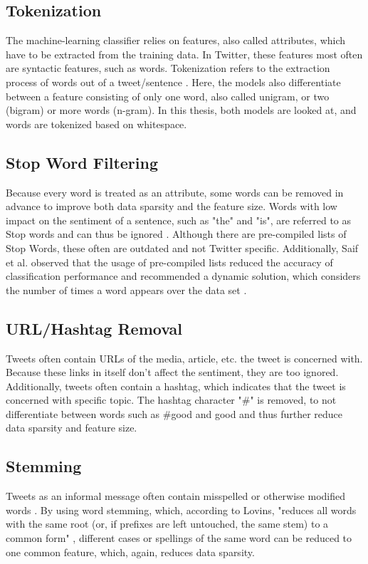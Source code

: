 \subsection{Tokenization}
The machine-learning classifier relies on features, also called attributes, which have to be extracted from the training data. In Twitter, these features most often are syntactic features, such as words. Tokenization refers to the extraction process of words out of a tweet/sentence \cite{DBLP:journals/csur/GiachanouC16}.  Here, the models also differentiate between a feature consisting of only one word, also called unigram, or two (bigram) or more words (n-gram). In this thesis, both models are looked at, and words are tokenized based on whitespace.
\subsection{Stop Word Filtering}
Because every word is treated as an attribute, some words can be removed in advance to improve both data sparsity and the feature size. Words with low impact on the sentiment of a sentence, such as "the" and "is", are referred to as Stop words and can thus be ignored \cite{DBLP:journals/csur/GiachanouC16}. Although there are pre-compiled lists of Stop Words, these often are outdated and not Twitter specific. Additionally, Saif et al. observed that the usage of pre-compiled lists reduced the accuracy of classification performance and recommended a dynamic solution, which considers the number of times a word appears over the data set \cite{data_sparsity}. 

\subsection{URL/Hashtag Removal}
Tweets often contain URLs of the media, article, etc. the tweet is concerned with. Because these links in itself don't affect the sentiment, they are too ignored. Additionally, tweets often contain a hashtag, which indicates that the tweet is concerned with specific topic. The hashtag character "\#" is removed, to not differentiate between words such as \#good and good and thus further reduce data sparsity and feature size.
\subsection{Stemming}
Tweets as an informal message often contain misspelled or otherwise modified words \cite{DBLP:journals/csur/GiachanouC16}. By using word stemming, which, according to Lovins, "reduces all words with the same root (or, if prefixes are left
untouched, the same stem) to a common form" \cite[p.~22]{Lovins1968DevelopmentOA}, different cases or spellings of the same word can be reduced to one common feature, which, again, reduces data sparsity.

